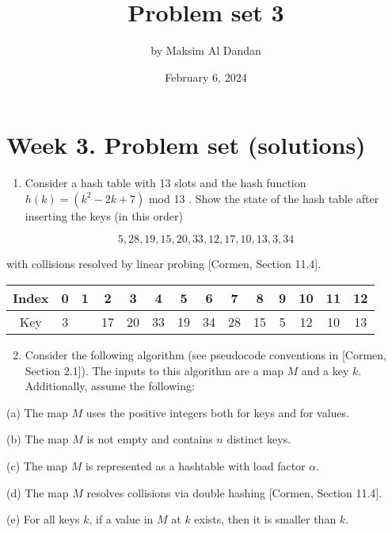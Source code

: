 \documentclass[10pt]{article}
\title{Problem set 3}
\author{by Maksim Al Dandan}
\date{February 6, 2024}
\begin{document}
\maketitle

\section*{Week 3. Problem set (solutions)}
\begin{enumerate}
  \item Consider a hash table with 13 slots and the hash function $h(k)=\left(k^{2}-2 k+7\right)$ mod 13 . Show the state of the hash table after inserting the keys (in this order)
\end{enumerate}

$$
5,28,19,15,20,33,12,17,10,13,3,34
$$

with collisions resolved by linear probing [Cormen, Section 11.4].

\begin{center}
\begin{tabular}{|c|c|c|c|c|c|c|c|c|c|c|c|c|c|}
\hline
Index & 0 & 1 & 2 & 3 & 4 & 5 & 6 & 7 & 8 & 9 & 10 & 11 & 12 \\
\hline
Key & 3 &  & 17 & 20 & 33 & 19 & 34 & 28 & 15 & 5 & 12 & 10 & 13 \\
\hline
\end{tabular}
\end{center}

\begin{enumerate}
  \setcounter{enumi}{1}
  \item Consider the following algorithm (see pseudocode conventions in [Cormen, Section 2.1]). The inputs to this algorithm are a map $M$ and a key $k$. Additionally, assume the following:
\end{enumerate}

(a) The map $M$ uses the positive integers both for keys and for values.

(b) The map $M$ is not empty and contains $n$ distinct keys.

(c) The map $M$ is represented as a hashtable with load factor $\alpha$.

(d) The map $M$ resolves collisions via double hashing [Cormen, Section 11.4].

(e) For all keys $k$, if a value in $M$ at $k$ exists, then it is smaller than $k$. \\ \\
\end{document}
